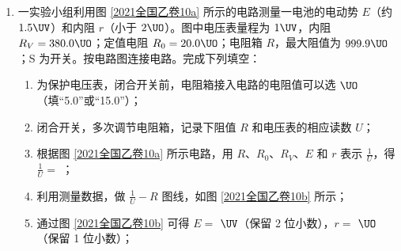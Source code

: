 \documentclass[\gkver]{gaokaozhenti}
\begin{document}
\begin{enumerate}
\begin{enumerate}
\end{enumerate}


\item
一实验小组利用图 \ref{2021全国乙卷10a} 所示的电路测量一电池的电动势 $E$（约 $1.5\UV$）和内阻 $r$（小于 $2\UO$）。图中电压表量程为 $1\UV$，内阻 $R_{V}=380.0\UO$；定值电阻 $R_{0}=20.0\UO$；电阻箱 $R$，最大阻值为 $999.9\UO$；S 为开关。按电路图连接电路。完成下列填空：


\begin{enumerate}
	\item
	为保护电压表，闭合开关前，电阻箱接入电路的电阻值可以选  $\UO$（填“5.0”或“15.0”）；

	\item
	闭合开关，多次调节电阻箱，记录下阻值 $R$ 和电压表的相应读数 $U$；

	\item
	根据图 \ref{2021全国乙卷10a} 所示电路，用 $R$、$R_{0}$、$R_{V}$、$E$ 和 $r$ 表示 $\frac{1}{U}$，得 $\frac{1}{U}=$ ；

	\item
	利用测量数据，做 $\frac{1}{U}-R$ 图线，如图 \ref{2021全国乙卷10b} 所示；

	\item
	通过图 \ref{2021全国乙卷10b} 可得 $E=$  $\UV$（保留 2 位小数），$r=$  $\UO$（保留 1 位小数）；


\end{enumerate}
\end{enumerate}
\end{document}
